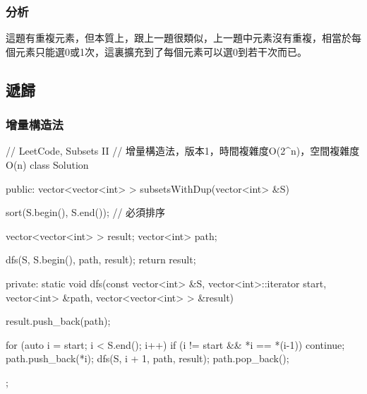 \subsubsection{分析}
這題有重複元素，但本質上，跟上一題很類似，上一題中元素沒有重複，相當於每個元素只能選0或1次，這裏擴充到了每個元素可以選0到若干次而已。


\subsection{遞歸}


\subsubsection{增量構造法}
\begin{Code}
// LeetCode, Subsets II
// 增量構造法，版本1，時間複雜度O(2^n)，空間複雜度O(n)
class Solution {
public:
    vector<vector<int> > subsetsWithDup(vector<int> &S) {
        sort(S.begin(), S.end());  // 必須排序

        vector<vector<int> > result;
        vector<int> path;

        dfs(S, S.begin(), path, result);
        return result;
    }

private:
    static void dfs(const vector<int> &S, vector<int>::iterator start,
            vector<int> &path, vector<vector<int> > &result) {
        result.push_back(path);

        for (auto i = start; i < S.end(); i++) {
            if (i != start && *i == *(i-1)) continue;
            path.push_back(*i);
            dfs(S, i + 1, path, result);
            path.pop_back();
        }
    }
};
\end{Code}

